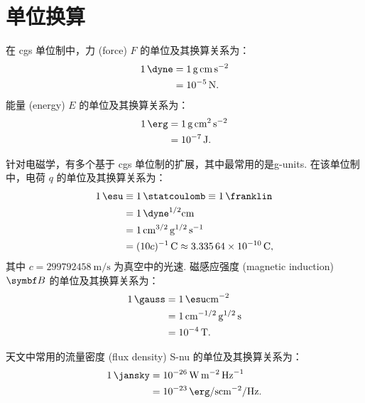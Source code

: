 
\chapter{单位换算}
\label{chap:units}

在 \ac{cgs} 单位制中，力 (force) $F$ 的单位及其换算关系为：
\begin{align}
  \label{eq:cgs-force}
  \SI{1}{\dyne}
    & = \SI{1}{\gram \cm \second\tothe{-2}} \\
    & = \SI{e-5}{\newton} .
\end{align}
能量 (energy) $E$ 的单位及其换算关系为：
\begin{align}
  \label{eq:cgs-work}
  \SI{1}{\erg}
    & = \SI{1}{\gram \cm\tothe{2} \second\tothe{-2}} \\
    & = \SI{e-7}{\joule} .
\end{align}

针对电磁学，有多个基于 \ac{cgs} 单位制的扩展，其中最常用的是\ac{g-units}.
在该单位制中，电荷 $q$ 的单位及其换算关系为：
\begin{align}
  \label{eq:gu-electrical-charge}
  \SI{1}{\esu}
    & \equiv \SI{1}{\statcoulomb} \equiv \SI{1}{\franklin} \\
    & = \SI{1}{\dyne\tothe{1/2} \cm} \\
    & = \SI{1}{\cm\tothe{3/2} \gram\tothe{1/2} \per\second} \\
    & = (10 c)^{-1}\,\si{\coulomb} \approx \SI{3.33564e-10}{\coulomb} ,
\end{align}
其中 $c = \SI{299792458}{\meter\per\second} $ 为真空中的光速.
磁感应强度 (magnetic induction) $\B{B}$ 的单位及其换算关系为：
\begin{align}
  \label{eq:gu-b-field}
  \SI{1}{\gauss}
    & = \SI{1}{\esu \cm\tothe{-2}} \\
    & = \SI{1}{\cm\tothe{-1/2} \gram\tothe{1/2} \second} \\
    & = \SI{e-4}{\tesla} .
\end{align}

天文中常用的流量密度 (flux density) \acs{S-nu} 的单位及其换算关系为：
\begin{align}
  \label{eq:jy-conv}
  \SI{1}{\jansky}
    & = \SI{e-26}{\watt \meter\tothe{-2} \per\hertz} \\
    & = \SI{e-23}{\erg \per\second \cm\tothe{-2} \per\hertz} .
\end{align}


